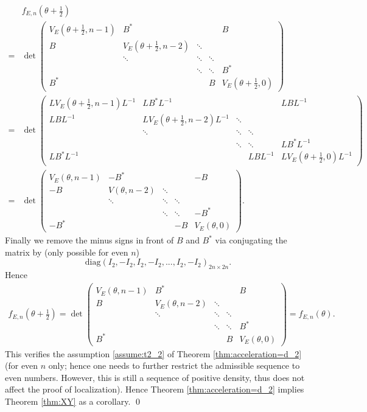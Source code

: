 \documentclass[11pt]{amsart}
\begin{document}
\begin{align}
   &f_{E,n}(\theta+\frac{1}{2})\\
=&
\det\left(\begin{matrix}
V_E(\theta+\frac{1}{2},n-1) & B^* & &  &B\\
B &V_E(\theta+\frac{1}{2},n-2) &\ddots \\
& \ddots &\ddots &\ddots \\
& &\ddots &\ddots &B^*\\
B^* & & &B &V_E(\theta+\frac{1}{2},0)
\end{matrix}\right)\\
=&
\det\left(\begin{matrix}
LV_E(\theta+\frac{1}{2},n-1)L^{-1} & LB^*L^{-1} & &  &LBL^{-1}\\
LBL^{-1} &LV_E(\theta+\frac{1}{2},n-2)L^{-1} &\ddots \\
& \ddots &\ddots &\ddots \\
& &\ddots &\ddots &LB^*L^{-1}\\
LB^*L^{-1} & & &LBL^{-1} &LV_E(\theta+\frac{1}{2},0)L^{-1}
\end{matrix}\right)\\
=&
\det\left(\begin{matrix}
V_E(\theta,n-1) & -B^* & &  &-B\\
-B &V(\theta,n-2) &\ddots \\
& \ddots &\ddots &\ddots \\
& &\ddots &\ddots &-B^*\\
-B^* & & &-B &V_E(\theta,0)
\end{matrix}\right).
\end{align}
Finally we remove the minus signs in front of $B$ and $B^*$ via conjugating the matrix by (only possible for even $n$)
\[\mathrm{diag}(I_2, -I_2, I_2, -I_2,..., I_2, -I_2)_{2n\times 2n}.\]
Hence
\begin{align}
f_{E,n}(\theta+\frac{1}{2})=\det\left(\begin{matrix}
V_E(\theta,n-1) & B^* & &  &B\\
B &V_E(\theta,n-2) &\ddots \\
& \ddots &\ddots &\ddots \\
& &\ddots &\ddots &B^*\\
B^* & & &B &V_E(\theta,0)
\end{matrix}\right)
=f_{E,n}(\theta).
\end{align}
This verifies the assumption \eqref{assume:t2_2} of Theorem \ref{thm:acceleration=d_2} (for even $n$ only; hence one needs to further restrict the admissible sequence to even numbers. However, this is still a sequence of positive density, thus does not affect the proof of localization).
Hence Theorem \ref{thm:acceleration=d_2} implies Theorem \ref{thm:XY} as a corollary. \qed
\end{document}
